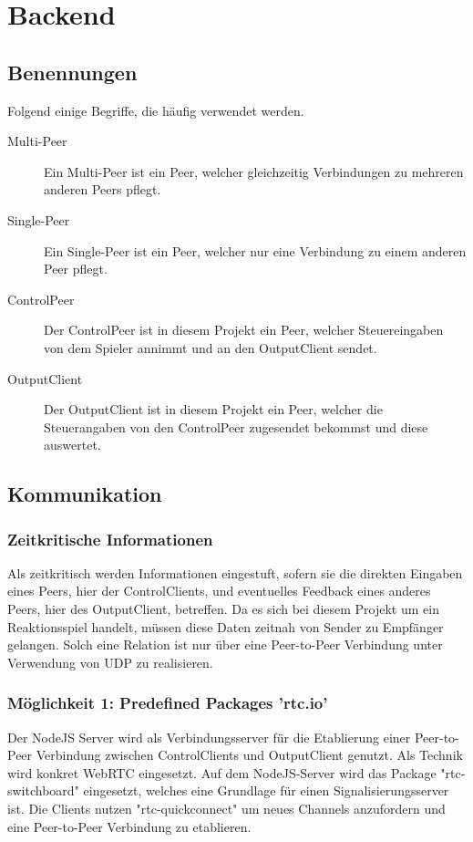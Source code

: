 \chapter{Backend}


\section{Benennungen}
Folgend einige Begriffe, die häufig verwendet werden.
\begin{description}
\item[Multi-Peer]
Ein Multi-Peer ist ein Peer, welcher gleichzeitig Verbindungen zu mehreren anderen Peers pflegt.

\item[Single-Peer]
Ein Single-Peer ist ein Peer, welcher nur eine Verbindung zu einem anderen Peer pflegt.

\item[ControlPeer]
Der ControlPeer ist in diesem Projekt ein Peer, welcher Steuereingaben von dem Spieler annimmt und an den OutputClient sendet.

\item[OutputClient]
Der OutputClient ist in diesem Projekt ein Peer, welcher die Steuerangaben von den ControlPeer zugesendet bekommst und diese auswertet.
\end{description}



\section{Kommunikation}

\subsection{Zeitkritische Informationen}
Als zeitkritisch werden Informationen eingestuft, sofern sie die direkten 
Eingaben eines Peers, hier der ControlClients, und eventuelles Feedback eines anderes Peers, hier des OutputClient, betreffen. 
Da es sich bei diesem Projekt um ein Reaktionsspiel handelt, müssen diese Daten zeitnah von Sender 
zu Empfänger gelangen. Solch eine Relation ist nur über eine Peer-to-Peer 
Verbindung unter Verwendung von UDP zu realisieren.



\subsection{Möglichkeit 1: Predefined Packages 'rtc.io'}
Der NodeJS Server wird als Verbindungsserver für die Etablierung einer 
Peer-to-Peer Verbindung zwischen ControlClients und OutputClient genutzt. Als 
Technik wird konkret WebRTC eingesetzt. Auf dem NodeJS-Server wird das Package 
"rtc-switchboard" eingesetzt, welches eine Grundlage für einen  
Signalisierungsserver ist. Die Clients nutzen "rtc-quickconnect" um neues 
Channels anzufordern und eine Peer-to-Peer Verbindung zu etablieren.

